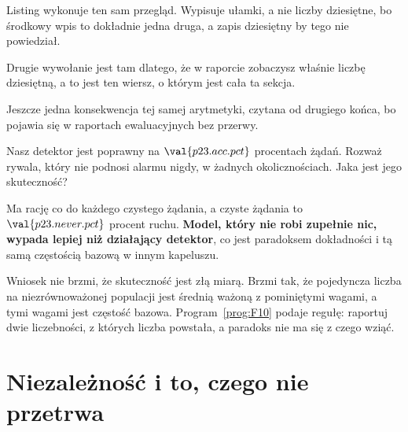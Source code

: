 \begin{fr}
Listing wykonuje ten sam przegląd. Wypisuje ułamki, a nie liczby dziesiętne,
bo środkowy wpis to dokładnie jedna druga, a zapis dziesiętny by tego nie
powiedział.


Drugie wywołanie jest tam dlatego, że w raporcie zobaczysz właśnie liczbę
dziesiętną, a to jest ten wiersz, o którym jest cała ta sekcja.
\end{fr}

\begin{fr}
Jeszcze jedna konsekwencja tej samej arytmetyki, czytana od drugiego końca, bo
pojawia się w raportach ewaluacyjnych bez przerwy.

Nasz detektor jest poprawny na $\val{p23.acc.pct}$ procentach żądań. Rozważ
rywala, który nie podnosi alarmu nigdy, w żadnych okolicznościach. Jaka jest
jego skuteczność?
\dotline
\nextframe
\end{fr}

\begin{fr}

Ma rację co do każdego czystego żądania, a czyste żądania to
$\val{p23.never.pct}$ procent ruchu. \textbf{Model, który nie robi zupełnie
nic, wypada lepiej niż działający detektor}, co jest paradoksem dokładności i
tą samą częstością bazową w innym kapeluszu.

\begin{warning}
Wniosek nie brzmi, że skuteczność jest złą miarą. Brzmi tak, że pojedyncza
liczba na niezrównoważonej populacji jest średnią ważoną z pominiętymi wagami,
a tymi wagami jest częstość bazowa. Program~\ref{prog:F10} podaje regułę:
raportuj dwie liczebności, z których liczba powstała, a paradoks nie ma się z
czego wziąć.
\end{warning}
\end{fr}

\section{Niezależność i to, czego nie przetrwa}
\label{sec:P23-independence}

